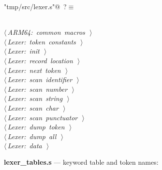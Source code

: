 \documentclass[11pt,a4paper,twoside,openright,DIV=15]{scrbook}
\theoremstyle{definition}
\theoremstyle{plain}
\theoremstyle{remark}
\begin{document}
\begin{flushleft} \small
\begin{minipage}{\linewidth}\label{scrap95}\raggedright\small
{} \verb@"tmp/src/lexer.s"@\nobreak\ {\footnotesize {?}}$\equiv$
\vspace{-1ex}
\begin{list}{}{} \item
\mbox{}\verb@@\\
\mbox{}\verb@@\hbox{$\langle\,${\itshape ARM64: common macros}\nobreak\ {\footnotesize {}}$\,\rangle$}\verb@@\\
\mbox{}\verb@@\hbox{$\langle\,${\itshape Lexer: token constants}\nobreak\ {\footnotesize {}}$\,\rangle$}\verb@@\\
\mbox{}\verb@@\hbox{$\langle\,${\itshape Lexer: init}\nobreak\ {\footnotesize {}}$\,\rangle$}\verb@@\\
\mbox{}\verb@@\hbox{$\langle\,${\itshape Lexer: record location}\nobreak\ {\footnotesize {}}$\,\rangle$}\verb@@\\
\mbox{}\verb@@\hbox{$\langle\,${\itshape Lexer: next token}\nobreak\ {\footnotesize {}}$\,\rangle$}\verb@@\\
\mbox{}\verb@@\hbox{$\langle\,${\itshape Lexer: scan identifier}\nobreak\ {\footnotesize {}}$\,\rangle$}\verb@@\\
\mbox{}\verb@@\hbox{$\langle\,${\itshape Lexer: scan number}\nobreak\ {\footnotesize {}}$\,\rangle$}\verb@@\\
\mbox{}\verb@@\hbox{$\langle\,${\itshape Lexer: scan string}\nobreak\ {\footnotesize {}}$\,\rangle$}\verb@@\\
\mbox{}\verb@@\hbox{$\langle\,${\itshape Lexer: scan char}\nobreak\ {\footnotesize {}}$\,\rangle$}\verb@@\\
\mbox{}\verb@@\hbox{$\langle\,${\itshape Lexer: scan punctuator}\nobreak\ {\footnotesize {}}$\,\rangle$}\verb@@\\
\mbox{}\verb@@\hbox{$\langle\,${\itshape Lexer: dump token}\nobreak\ {\footnotesize {}}$\,\rangle$}\verb@@\\
\mbox{}\verb@@\hbox{$\langle\,${\itshape Lexer: dump all}\nobreak\ {\footnotesize {}}$\,\rangle$}\verb@@\\
\mbox{}\verb@@\hbox{$\langle\,${\itshape Lexer: data}\nobreak\ {\footnotesize {}}$\,\rangle$}\verb@@\\
\mbox{}\verb@@{\NWsep}
\end{list}
\vspace{-1.5ex}
\footnotesize
\begin{list}{}{\setlength{\itemsep}{-\parsep}\setlength{\itemindent}{-\leftmargin}}

\item{}
\end{list}
\end{minipage}\vspace{4ex}
\end{flushleft}
\noindent\textbf{lexer\_tables.s} --- keyword table and token names:
\end{document}

